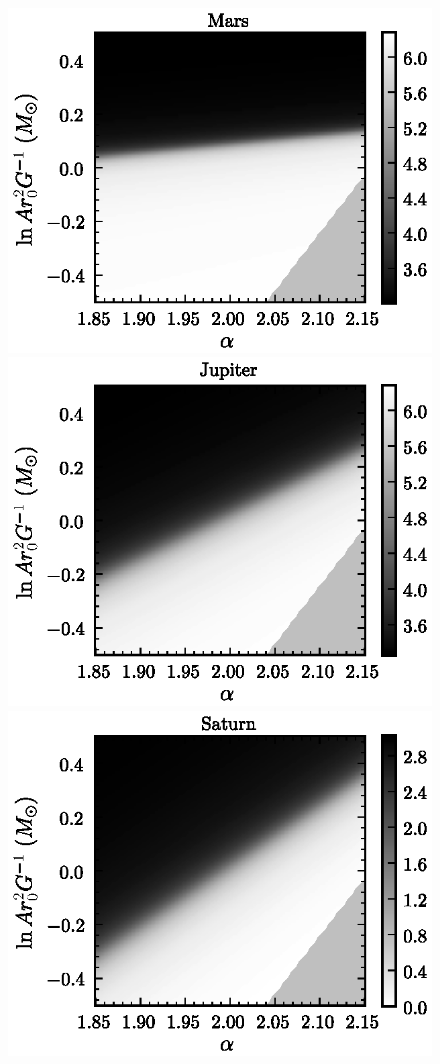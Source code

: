 \begin{figure}
\includegraphics[height=.2\textheight]{figs_solarsystem/phase_Mars.ps}\\
\includegraphics[height=.2\textheight]{figs_solarsystem/phase_Jupiter.ps}
\includegraphics[height=.2\textheight]{figs_solarsystem/phase_Saturn.ps}\\

\end{figure}
